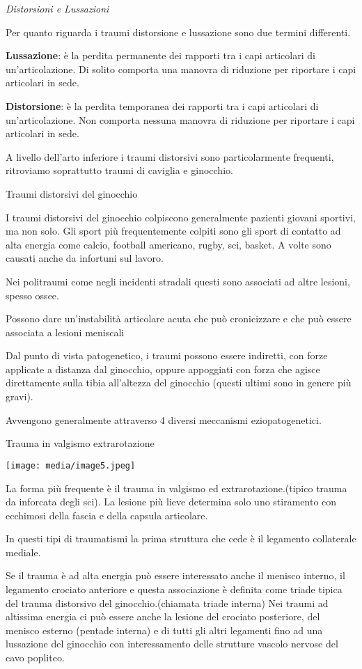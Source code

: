 \documentclass[]{article}
\begin{document}
\emph{Distorsioni e Lussazioni }

Per quanto riguarda i traumi distorsione e lussazione sono due termini
differenti.

\textbf{Lussazione}: è la perdita permanente dei rapporti tra i capi
articolari di un'articolazione. Di solito comporta una manovra di
riduzione per riportare i capi articolari in sede.

\textbf{Distorsione}: è la perdita temporanea dei rapporti tra i capi
articolari di un'articolazione. Non comporta nessuna manovra di
riduzione per riportare i capi articolari in sede.

A livello dell'arto inferiore i traumi distorsivi sono particolarmente
frequenti, ritroviamo soprattutto traumi di caviglia e ginocchio.

Traumi distorsivi del ginocchio

I traumi distorsivi del ginocchio colpiscono generalmente pazienti
giovani sportivi, ma non solo. Gli sport più frequentemente colpiti sono
gli sport di contatto ad alta energia come calcio, football americano,
rugby, sci, basket. A volte sono causati anche da infortuni sul lavoro.

Nei politraumi come negli incidenti stradali questi sono associati ad
altre lesioni, spesso ossee.

Possono dare un'instabilità articolare acuta che può cronicizzare e che
può essere associata a lesioni meniscali

Dal punto di vista patogenetico, i traumi possono essere indiretti, con
forze applicate a distanza dal ginocchio, oppure appoggiati con forza
che agisce direttamente sulla tibia all'altezza del ginocchio (questi
ultimi sono in genere più gravi).

Avvengono generalmente attraverso 4 diversi meccanismi eziopatogenetici.

Trauma in valgismo extrarotazione

\texttt{[image: media/image5.jpeg]}

La forma più frequente è il trauma in valgismo ed extrarotazione.(tipico
trauma da inforcata degli sci). La lesione più lieve determina solo uno
stiramento con ecchimosi della fascia e della capsula articolare.

In questi tipi di traumatismi la prima struttura che cede è il legamento
collaterale mediale.

Se il trauma è ad alta energia può essere interessato anche il menisco
interno, il legamento crociato anteriore e questa associazione è
definita come triade tipica del trauma distorsivo del
ginocchio.(chiamata triade interna) Nei traumi ad altissima energia ci
può essere anche la lesione del crociato posteriore, del menisco esterno
(pentade interna) e di tutti gli altri legamenti fino ad una lussazione
del ginocchio con interessamento delle strutture vascolo nervose del
cavo popliteo.
\end{document}
